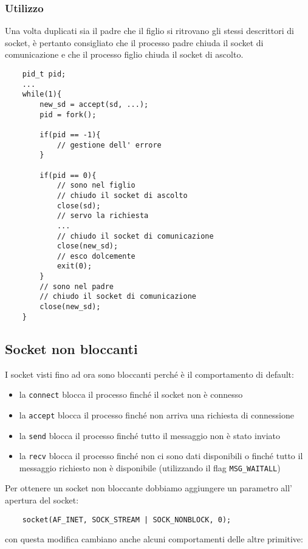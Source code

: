 {{\subsubsection{Utilizzo}
Una volta duplicati sia il padre che il figlio si ritrovano gli stessi descrittori di socket, è pertanto consigliato che il processo padre chiuda il socket di comunicazione e che il processo figlio chiuda il socket di ascolto.
\begin{verbatim}
    pid_t pid;
    ...
    while(1){
        new_sd = accept(sd, ...);
        pid = fork();
        
        if(pid == -1){
            // gestione dell' errore
        }
        
        if(pid == 0){
            // sono nel figlio
            // chiudo il socket di ascolto
            close(sd);
            // servo la richiesta
            ...
            // chiudo il socket di comunicazione
            close(new_sd);
            // esco dolcemente
            exit(0);
        }
        // sono nel padre
        // chiudo il socket di comunicazione
        close(new_sd);
    }
\end{verbatim}

\subsection{Socket non bloccanti}
I socket visti fino ad ora sono bloccanti perché è il comportamento di default:
\begin{itemize}
    \item la \verb{connect{ blocca il processo finché il socket non è connesso
    \item la \verb{accept{ blocca il processo finché non arriva una richiesta di connessione
    \item la \verb{send{ blocca il processo finché tutto il messaggio non è stato inviato
    \item la \verb{recv{ blocca il processo finché non ci sono dati disponibili o finché tutto il messaggio richiesto non è disponibile (utilizzando il flag \verb{MSG_WAITALL{)
\end{itemize}

Per ottenere un socket non bloccante dobbiamo aggiungere un parametro all' apertura del socket:
\begin{verbatim}
    socket(AF_INET, SOCK_STREAM | SOCK_NONBLOCK, 0);
\end{verbatim}
con questa modifica cambiano anche alcuni comportamenti delle altre primitive:
\begin{itemize}
    \item \verb{connect(){: se non può connettersi restituisce -1 ed imposta \verb{errno{ a \verb{EINPROGRESS{
    
}}}
\end{itemize}}}
